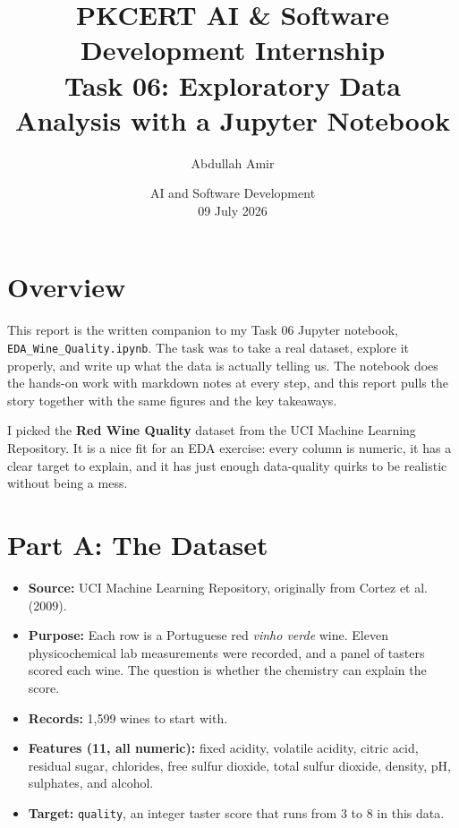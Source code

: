 \documentclass[11pt,a4paper]{article}
\title{\vspace{-1.5cm}\textbf{PKCERT AI \& Software Development Internship \\ Task 06: Exploratory Data Analysis with a Jupyter Notebook}}
\author{Abdullah Amir}
\date{AI and Software Development \\ 09 July 2026}
\begin{document}
\maketitle
\vspace{-1cm}

\tableofcontents
\vspace{0.5cm}

\section*{Overview}
This report is the written companion to my Task 06 Jupyter notebook,
\texttt{EDA\_Wine\_Quality.ipynb}. The task was to take a real dataset, explore
it properly, and write up what the data is actually telling us. The notebook
does the hands-on work with markdown notes at every step, and this report pulls
the story together with the same figures and the key takeaways.

I picked the \textbf{Red Wine Quality} dataset from the UCI Machine Learning
Repository. It is a nice fit for an EDA exercise: every column is numeric, it has
a clear target to explain, and it has just enough data-quality quirks to be
realistic without being a mess.

\section*{Part A: The Dataset}
\begin{itemize}[leftmargin=1.4em]
    \item \textbf{Source:} UCI Machine Learning Repository, originally from
    Cortez et al. (2009).
    \item \textbf{Purpose:} Each row is a Portuguese red \emph{vinho verde}
    wine. Eleven physicochemical lab measurements were recorded, and a panel of
    tasters scored each wine. The question is whether the chemistry can explain
    the score.
    \item \textbf{Records:} 1,599 wines to start with.
    \item \textbf{Features (11, all numeric):} fixed acidity, volatile acidity,
    citric acid, residual sugar, chlorides, free sulfur dioxide, total sulfur
    dioxide, density, pH, sulphates, and alcohol.
    \item \textbf{Target:} \texttt{quality}, an integer taster score that runs
    from 3 to 8 in this data.
\end{itemize}
\end{document}
